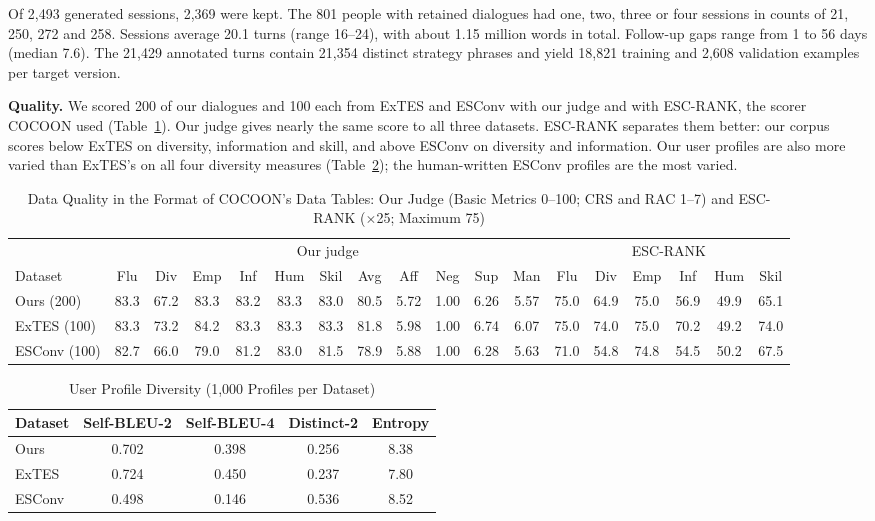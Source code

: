 \documentclass[journal]{IEEEtran}
\newcommand{\tsize}{\footnotesize}
\begin{document}
Of 2,493 generated sessions, 2,369 were kept. The 801 people with retained dialogues had one, two, three or four sessions in counts of 21, 250, 272 and 258. Sessions average 20.1 turns (range 16--24), with about 1.15 million words in total. Follow-up gaps range from 1 to 56 days (median 7.6). The 21,429 annotated turns contain 21,354 distinct strategy phrases and yield 18,821 training and 2,608 validation examples per target version.

\textbf{Quality.} We scored 200 of our dialogues and 100 each from ExTES and ESConv with our judge and with ESC-RANK, the scorer COCOON used (Table~\ref{tab:quality}). Our judge gives nearly the same score to all three datasets. ESC-RANK separates them better: our corpus scores below ExTES on diversity, information and skill, and above ESConv on diversity and information. Our user profiles are also more varied than ExTES's on all four diversity measures (Table~\ref{tab:div}); the human-written ESConv profiles are the most varied.

\begin{table}[!t]
\caption{Data Quality in the Format of COCOON's Data Tables: Our Judge (Basic Metrics 0--100; CRS and RAC 1--7) and ESC-RANK (\(\times\)25; Maximum 75)}
\label{tab:quality}
\centering\tsize
\begin{tabular}{@{}lccccccccccc|cccccc@{}}
\toprule
 & \multicolumn{11}{c|}{Our judge} & \multicolumn{6}{c}{ESC-RANK}\\
Dataset & Flu & Div & Emp & Inf & Hum & Skil & Avg & Aff & Neg & Sup & Man & Flu & Div & Emp & Inf & Hum & Skil\\
\midrule
Ours (200) & 83.3 & 67.2 & 83.3 & 83.2 & 83.3 & 83.0 & 80.5 & 5.72 & 1.00 & 6.26 & 5.57 & 75.0 & 64.9 & 75.0 & 56.9 & 49.9 & 65.1\\
ExTES (100) & 83.3 & 73.2 & 84.2 & 83.3 & 83.3 & 83.3 & 81.8 & 5.98 & 1.00 & 6.74 & 6.07 & 75.0 & 74.0 & 75.0 & 70.2 & 49.2 & 74.0\\
ESConv (100) & 82.7 & 66.0 & 79.0 & 81.2 & 83.0 & 81.5 & 78.9 & 5.88 & 1.00 & 6.28 & 5.63 & 71.0 & 54.8 & 74.8 & 54.5 & 50.2 & 67.5\\
\bottomrule
\end{tabular}
\end{table}

\begin{table}[!htb]
\caption{User Profile Diversity (1,000 Profiles per Dataset)}
\label{tab:div}
\centering\tsize
\begin{tabular}{@{}lcccc@{}}
\toprule
Dataset & Self-BLEU-2 & Self-BLEU-4 & Distinct-2 & Entropy\\
\midrule
Ours & 0.702 & 0.398 & 0.256 & 8.38\\
ExTES & 0.724 & 0.450 & 0.237 & 7.80\\
ESConv & 0.498 & 0.146 & 0.536 & 8.52\\
\bottomrule
\end{tabular}
\end{table}
\end{document}
